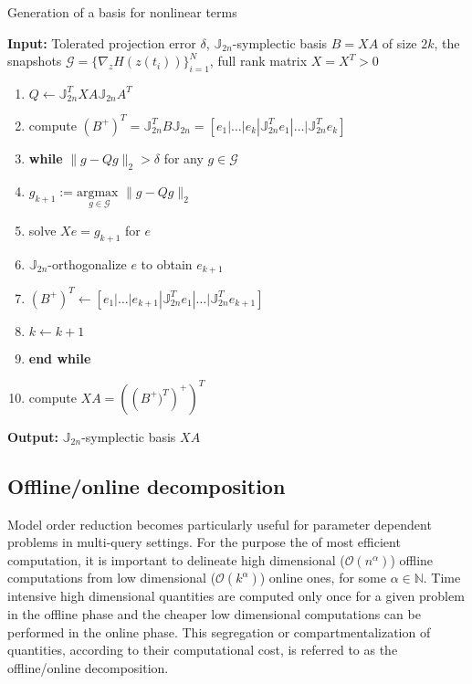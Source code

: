 \begin{algorithm} 
\caption{Generation of a basis for nonlinear terms} \label{alg:3}
{\bf Input:} Tolerated projection error $\delta$, $\mathbb J_{2n}$-symplectic basis $B = X A$ of size $2k$, the snapshots $\mathcal G = \{ \nabla_zH(z(t_i))\}_{i=1}^{N}$, full rank matrix $X=X^T>0$
\begin{enumerate}
\item $Q \leftarrow \mathbb J_{2n}^T X A \mathbb J_{2n}A^T$
\item compute $(B^+)^T = \mathbb J_{2n}^T B \mathbb J_{2n} = [e_1|\dots |e_{k} | \mathbb J_{2n}^Te_1|\dots| \mathbb J_{2n}^Te_{k}]$
\item \textbf{while} $\| g - Q g \|_2 > \delta$ for any $g \in \mathcal G$
\item \hspace{0.5cm} $g_{k+1} := \underset{g\in \mathcal G}{\text{argmax }} \| g -  Q g  \|_2$
\item \hspace{0.5cm} solve $X e = g_{k+1}$ for $e$
\item \hspace{0.5cm} $\mathbb J_{2n}$-orthogonalize $e$ to obtain $e_{k+1}$
\item \hspace{0.5cm} $(B^+)^T \leftarrow [e_1|\dots |e_{k+1} | \mathbb J_{2n}^Te_1|\dots| \mathbb J_{2n}^Te_{k+1}]$
\item \hspace{0.5cm} $k \leftarrow k+1$
\item \textbf{end while}
\item compute $XA = \left( \left (B^+)^T \right)^+ \right)^T$
\end{enumerate}
\vspace{0.5cm}
{\bf Output:} $\mathbb J_{2n}$-symplectic basis $XA$
\end{algorithm}

\subsection{Offline/online decomposition} \label{sec:normmor.4}
Model order reduction becomes particularly useful for parameter dependent problems in multi-query settings. For the purpose the of most efficient computation, it is important to delineate high dimensional ($\mathcal{O}(n^{\alpha})$) offline computations from low dimensional ($\mathcal{O}(k^{\alpha})$) online ones, for some $\alpha \in \mathbb N$. Time intensive high dimensional quantities are computed only once for a given problem in the offline phase and the cheaper low dimensional computations can be performed in the online phase. This segregation or compartmentalization of quantities, according to their computational cost, is referred to as the offline/online decomposition.

